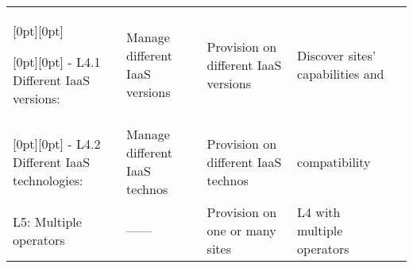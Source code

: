 \begin{tabular}{@{} l L L L @{} >{\kern\tabcolsep}l @{}}
    [0pt][0pt]

    [0pt][0pt]
    - L4.1 Different IaaS versions:&
    Manage different IaaS versions&
    Provision on different IaaS versions&
    Discover sites' capabilities and\\
    
    [0pt][0pt]
    - L4.2 Different IaaS technologies:&
    Manage different IaaS technos&
    Provision on different IaaS technos&
    compatibility\\

    L5: Multiple operators &
    \hfill ------ \hfill &
    Provision on one or many sites&
    L4 with multiple operators\\ 

    \bottomrule

\end{tabular}

